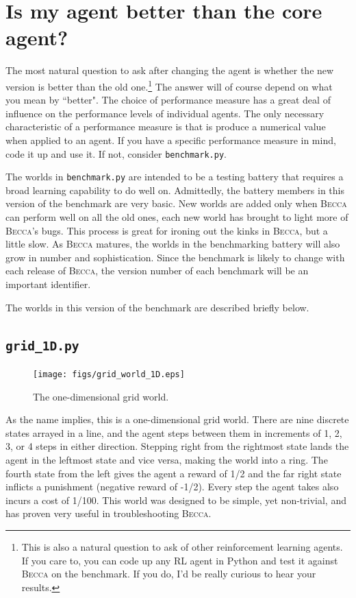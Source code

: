 \section{Is my agent better than the core agent?}
The most natural question to ask after changing the agent is whether the new version is better than the old one.\footnote{This is also a natural question to ask of other reinforcement learning agents. If you care to, you can code up any RL agent in Python and test it against \textsc{Becca} on the benchmark. If you do, I'd be really curious to hear your results.} The answer will of course depend on what you mean by ``better". The choice of performance measure has a great deal of influence on the performance levels of individual agents. The only necessary characteristic of a performance measure is that is produce a numerical value when applied to an agent. If you have a specific performance measure in mind, code it up and use it. If not, consider \texttt{benchmark.py}. 

The worlds in \texttt{benchmark.py} are intended to be a testing battery that requires a broad learning capability to do well on. Admittedly, the battery members in this version of the benchmark are very basic. New worlds are added only when \textsc{Becca} can perform well on all the old ones, each new world has brought to light more of \textsc{Becca}'s bugs. This process is great for ironing out the kinks in \textsc{Becca}, but a little slow. As \textsc{Becca} matures, the worlds in the benchmarking battery will also grow in number and sophistication. Since the benchmark is likely to change with each release of \textsc{Becca}, the version number of each benchmark will be an important identifier.

The worlds in this version of the benchmark are described briefly below.

\subsection{\texttt{grid\_1D.py}}

\begin{figure}
\centering
\texttt{[image: figs/grid\_world\_1D.eps]}
\caption{The one-dimensional grid world.}
\label{grid_1D}
\end{figure}

As the name implies, this is a one-dimensional grid world. There are nine discrete states arrayed in a line, and the agent steps between them in increments of 1, 2, 3, or 4 steps in either direction. Stepping right from the rightmost state lands the agent in the leftmost state and vice versa, making the world into a ring. The fourth state from the left gives the agent a reward of 1/2 and the far right state inflicts a punishment (negative reward of -1/2). Every step the agent takes also incurs a cost of  1/100. This world was designed to be simple, yet non-trivial, and has proven very useful in troubleshooting \textsc{Becca}.

